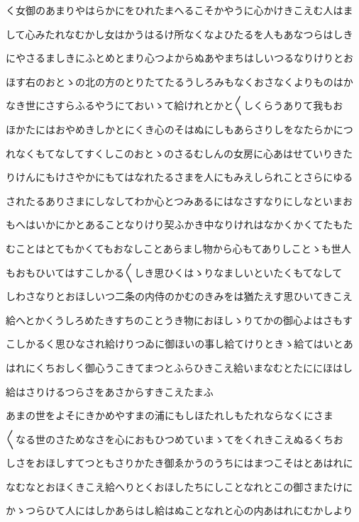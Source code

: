 \documentclass[a4paper,11pt,landscape]{ltjtarticle}
\begin{document}
く女御のあまりやはらかにをひれたまへるこそかやうに心かけきこえむ人はま
\par\medskip
して心みたれなむかし女はかうはるけ所なくなよひたるを人もあなつらはしき
\par\medskip
にやさるましきにふとめとまり心つよからぬあやまちはしいつるなりけりとお
\par\medskip
ほす右のおとゝの北の方のとりたてたるうしろみもなくおさなくよりものはか
\par\medskip
なき世にさすらふるやうにておいゝて給けれとかと〱しくらうありて我もお
\par\medskip
ほかたにはおやめきしかとにくき心のそはぬにしもあらさりしをなたらかにつ
\par\medskip
れなくもてなしてすくしこのおとゝのさるむしんの女房に心あはせていりきた
\par\medskip
りけんにもけさやかにもてはなれたるさまを人にもみえしられことさらにゆる
\par\medskip
されたるありさまにしなしてわか心とつみあるにはなさすなりにしなといまお
\par\medskip
もへはいかにかとあることなりけり契ふかき中なりけれはなかくかくてたもた
\par\medskip
むことはとてもかくてもおなしことあらまし物から心もてありしことゝも世人
\par\medskip
もおもひいてはすこしかる〱しき思ひくはゝりなましいといたくもてなして
\par\medskip
しわさなりとおほしいつ二条の内侍のかむのきみをは猶たえす思ひいてきこえ
\par\medskip
給へとかくうしろめたきすちのことうき物におほしゝりてかの御心よはさもす
\par\medskip
こしかるく思ひなされ給けりつゐに御ほいの事し給てけりときゝ給てはいとあ
\par\medskip
はれにくちおしく御心うこきてまつとふらひきこえ給いまなむとたににほはし
\par\medskip
給はさりけるつらさをあさからすきこえたまふ
\par\medskip
あまの世をよそにきかめやすまの浦にもしほたれしもたれならなくにさま
\par\medskip
〱なる世のさためなさを心におもひつめていまゝてをくれきこえぬるくちお
\par\medskip
しさをおほしすてつともさりかたき御ゑかうのうちにはまつこそはとあはれに
\par\medskip
なむなとおほくきこえ給へりとくおほしたちにしことなれとこの御さまたけに
\par\medskip
かゝつらひて人にはしかあらはし給はぬことなれと心の内あはれにむかしより
\end{document}

